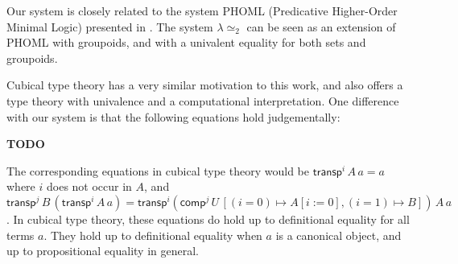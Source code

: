 \documentclass{easychair}
\newcommand{\LEtwo}{\ensuremath{\lambda \simeq_2}}
\begin{document}
Our system is closely related to the system PHOML (Predicative Higher-Order Minimal Logic) presented in \cite{abc:ncrpehoml}.  The system $\LEtwo$ can be seen as an extension of PHOML with groupoids, and with a univalent equality for both sets and groupoids.

Cubical type theory \cite{cchm:cubical, huber:canonicity} has a very similar motivation to this work, and also offers a type theory with univalence and a computational interpretation.  One difference with our system is that the following equations hold judgementally:

\textbf{TODO}

The corresponding equations in cubical type theory would be $\mathsf{transp}^i \, A \, a = a$ where $i$ does not occur in $A$, and $\mathsf{transp}^j \, B \, (\mathsf{transp}^i \, A \, a) = \mathsf{transp}^i (\mathsf{comp}^j \, U \, [(i = 0) \mapsto A[i:=0], (i=1) \mapsto B]) \, A \, a$.  In cubical type theory, these equations do hold up to definitional equality for all terms $a$.  They hold up to definitional equality when $a$ is a canonical object, and up to propositional equality in general.


\end{document}
